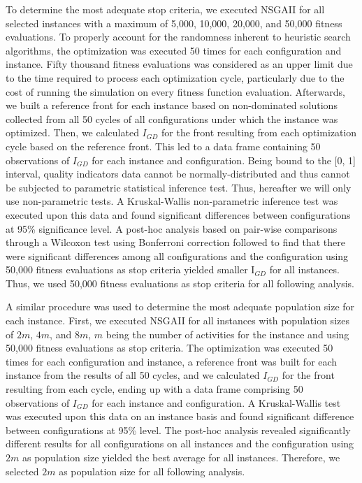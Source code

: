 \documentclass[conference]{IEEEtran}
\begin{document}
To determine the most adequate stop criteria, we executed NSGAII for all selected instances with a maximum of 5,000, 10,000, 20,000, and 50,000 fitness evaluations. To properly account for the randomness inherent to heuristic search algorithms, the optimization was executed 50 times for each configuration and instance. Fifty thousand fitness evaluations was considered as an upper limit due to the time required to process each optimization cycle, particularly due to the cost of running the simulation on every fitness function evaluation. Afterwards, we built a reference front for each instance based on non-dominated solutions collected from all 50 cycles of all configurations under which the instance was optimized. Then, we calculated $I_{GD}$ for the front resulting from each optimization cycle based on the reference front. This led to a data frame containing 50 observations of $I_{GD}$ for each instance and configuration. Being bound to the [0, 1] interval, quality indicators data cannot be normally-distributed and thus cannot be subjected to parametric statistical inference test. Thus, hereafter we will only use non-parametric tests. A Kruskal-Wallis non-parametric inference test was executed upon this data and found significant differences between configurations at 95\% significance level. A post-hoc analysis based on pair-wise comparisons through a Wilcoxon test using Bonferroni correction followed to find that there were significant differences among all configurations and the configuration using 50,000 fitness evaluations as stop criteria yielded smaller I$_{GD}$ for all instances. Thus, we used 50,000 fitness evaluations as stop criteria for all following analysis.

A similar procedure was used to determine the most adequate population size for each instance. First, we executed NSGAII for all instances with population sizes of $2m$, $4m$, and $8m$, $m$ being the number of activities for the instance and using 50,000 fitness evaluations as stop criteria. The optimization was executed 50 times for each configuration and instance, a reference front was built for each instance from the results of all 50 cycles, and we calculated $I_{GD}$ for the front resulting from each cycle, ending up with a data frame comprising 50 observations of $I_{GD}$ for each instance and configuration. A Kruskal-Wallis test was executed upon this data on an instance basis and found significant difference between configurations at 95\% level. The post-hoc analysis revealed significantly different results for all configurations on all instances and the configuration using $2m$ as population size yielded the best average for all instances. Therefore, we selected $2m$ as population size for all following analysis.
\end{document}
